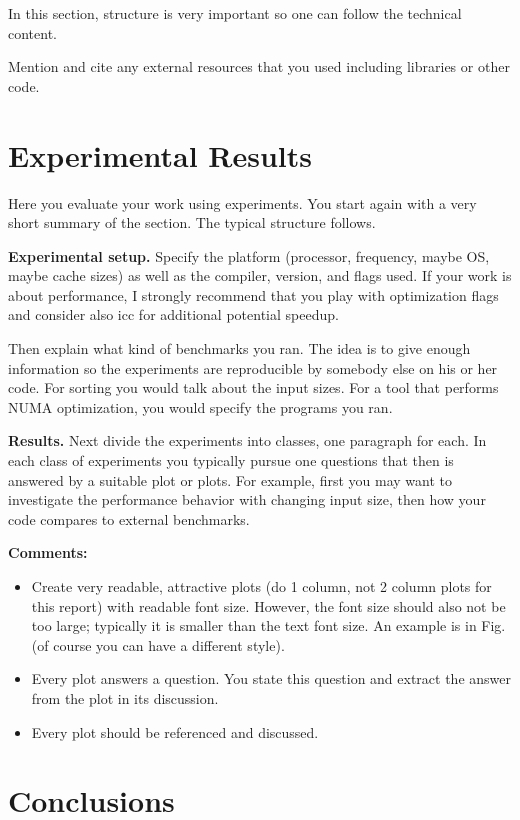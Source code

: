 \documentclass[sigconf]{acmart}
\newcommand{\mypar}[1]{{\bf #1.}}
\begin{document}
In this section, structure is very important so one can follow the technical
content.

Mention and cite any external resources that you used including libraries or
other code.

\section{Experimental Results}\label{sec:exp}

Here you evaluate your work using experiments. You start again with a very
short summary of the section. The typical structure follows.

\mypar{Experimental setup} Specify the platform (processor, frequency, maybe OS, maybe cache sizes)
as well as the compiler, version, and flags used. If your work is about performance,
I strongly recommend that you play with optimization flags and consider also icc for additional potential speedup.

Then explain what kind of benchmarks you ran. The idea is to give enough
information so the experiments are reproducible by somebody else on his or her
code. For sorting you would talk about the input sizes. For a tool that
performs NUMA optimization, you would specify the programs you ran.

\mypar{Results}
Next divide the experiments into classes, one paragraph for each. In each class of experiments you typically pursue one questions that then is answered by a suitable plot or plots. For example, first you may want to investigate the performance behavior with changing input size, then how your code compares to external benchmarks.

  {\bf Comments:}
\begin{itemize}
  \item Create very readable, attractive plots (do 1 column, not 2 column plots for
        this report) with readable font size. However, the font size should also not be
        too large; typically it is smaller than the text font size. An example is in
        Fig. (of course you can have a different style).
  \item Every plot answers a question. You state this question and extract the answer
        from the plot in its discussion.
  \item Every plot should be referenced and discussed.
\end{itemize}

\section{Conclusions}
\end{document}
